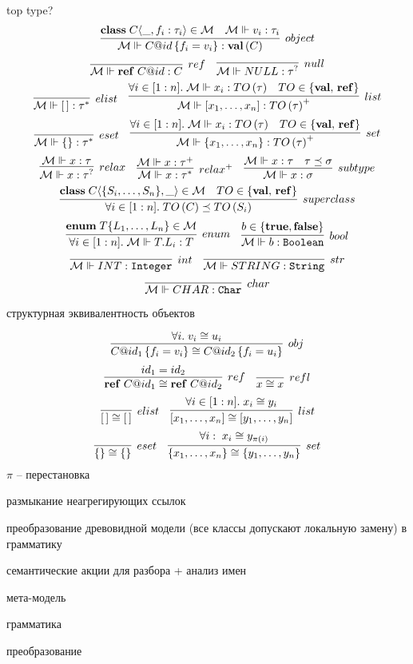 top type?
\newcommand{\classf}[3]{\mathbf{class}\; #1 \langle #2, #3\rangle}
\newcommand{\type}[2]{#1\left(#2\right)}
\newcommand{\valts}{\mathbf{val}}
\newcommand{\valt}[1]{\type{\valts}{#1}}
\newcommand{\refts}{\mathbf{ref}}
\newcommand{\reft}[1]{\type{\refts}{#1}}
\newcommand{\refv}[2]{\mathbf{ref}\; #1@#2}
\newcommand{\reference}[3]{\mathbf{#1}\langle #2 : #3\rangle}
\newcommand{\attribute}[2]{\mathbf{attr}\langle #1 : #2\rangle}
\newcommand{\obj}[3]{#1@#2\left\{#3\right\}}
\newcommand{\fromMM}{\MM{M} \Vdash}
$$
	\infer[object]{
		\fromMM \obj{C}{id}{f_i = v_i} : \valt{C}
	}{
		\classf{C}{\_}{f_i : \tau_i} \in \MM{M}&
		\fromMM v_i : \tau_i
	}
$$
$$
\infer[ref]{
	\fromMM \refv{C}{id} : C
}{}
\quad
\infer[null]{
	\fromMM NULL : \tau^?
}{}
$$
$$
\infer[elist]{
	\fromMM [\,] : \tau^*
}{}
\quad
\infer[list]{
	\fromMM [x_1, \ldots, x_n] : \type{TO}{\tau}^+
}{
	\forall i\in[1:n]. \; \fromMM x_i : \type{TO}{\tau} &
	TO \in \{\valts,\, \refts\}
}
$$
$$
\infer[eset]{
	\fromMM \{\} : \tau^*
}{}
\quad
\infer[set]{
	\fromMM \{x_1, \ldots, x_n\} : \type{TO}{\tau}^+
}{
	\forall i\in[1:n]. \; \fromMM x_i : \type{TO}{\tau} &
	TO \in \{\valts,\, \refts\}
}
$$
$$
\infer[relax]{
	\fromMM x : \tau^?
}{
	\fromMM x : \tau
}
\quad
\infer[relax^+]{
	\fromMM x : \tau^*
}{
	\fromMM x : \tau^+
}
\quad
\infer[subtype]{
	\fromMM x : \sigma
}{
	\fromMM x : \tau &
	\tau \subtype \sigma
}
$$
$$
\infer[superclass]{
	\forall i \in [1:n].\; \type{TO}{C} \subtype \type{TO}{S_i}
}{
	\classf{C}{\{S_i, \ldots, S_n\}}{\_} \in \MM{M} &
	TO \in \{\valts,\, \refts\}
}
$$
$$
\infer[enum]{
	\forall i \in [1:n]. \; \fromMM T.L_i : T
}{
	\mathbf{enum}\;T\{L_1,\ldots,L_n\} \in \MM{M}
}
\quad
\infer[bool]{
	\fromMM b : \mathtt{Boolean}
}{
	b \in \{\mathbf{true}, \mathbf{false}\}
}
$$
$$
\infer[int]{\fromMM INT : \mathtt{Integer}}{}
\quad
\infer[str]{\fromMM STRING : \mathtt{String}}{}
$$
$$
\infer[char]{\fromMM CHAR : \mathtt{Char}}{}
$$

структурная эквивалентность объектов

$$
\infer[obj]{
	\obj{C}{id_1}{f_i = v_i} \cong \obj{C}{id_2}{f_i = u_i}
}{
	\forall i. \; v_i \cong u_i
}
$$
$$
\infer[ref]{
	\refv{C}{id_1} \cong \refv{C}{id_2}
}{
	id_1 = id_2
}
\quad
\infer[refl]{x \cong x}{}
$$
$$
\infer[elist]{[\,] \cong [\,]}{}
\quad
\infer[list]{
	[x_1,\ldots,x_n] \cong [y_1,\ldots,y_n]
}{
	\forall i \in [1:n]. \; x_i \cong y_i
}
$$
$$
\infer[eset]{\{\} \cong \{\}}{}
\quad
\infer[set]{
	\{x_1,\ldots,x_n\} \cong \{y_1,\ldots,y_n\}
}{
	\forall i :\; x_i \cong y_{\pi(i)}
}
$$
$\pi$ -- перестановка

размыкание неагрегирующих ссылок

преобразование древовидной модели (все классы допускают локальную замену) в грамматику

семантические акции для разбора + анализ имен

мета-модель

грамматика

преобразование
